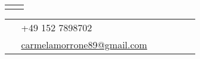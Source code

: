 \documentclass[10pt]{article} %
\begin{document}
\begin{paracol}{2}
\begin{supertabular}{rl}
	
	\tableentry{}{}{} %
	
	
	
	
\end{supertabular}

\medskip %


\switchcolumn %


\parbox[top][0.12\textheight][c]{\linewidth}{ %
	\vspace{-0.04\textheight} %
	\colorbox{shade}{ %
		\begin{supertabular}{p{0.05\linewidth}|p{0.775\linewidth}} %
			\raisebox{-1pt}{\faPhone} & +49 152 7898702 \\ %
			\raisebox{0pt}{\small\faEnvelope} & \href{mailto:carmelamorrone89@gmail.com}{carmelamorrone89@gmail.com} \\ %
		\end{supertabular}
	}
}



\end{paracol}
\end{document}
